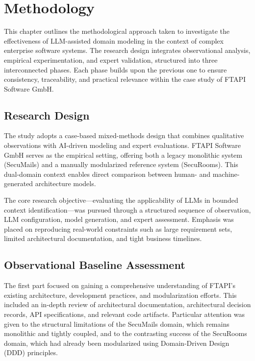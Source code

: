 \chapter{Methodology}\label{chapter:method}

This chapter outlines the methodological approach taken to investigate the effectiveness of LLM-assisted domain modeling in the context of complex enterprise software systems. The research design integrates observational analysis, empirical experimentation, and expert validation, structured into three interconnected phases. Each phase builds upon the previous one to ensure consistency, traceability, and practical relevance within the case study of FTAPI Software GmbH.

\section{Research Design}

The study adopts a case-based mixed-methods design that combines qualitative observations with AI-driven modeling and expert evaluations. FTAPI Software GmbH serves as the empirical setting, offering both a legacy monolithic system (SecuMails) and a manually modularized reference system (SecuRooms). This dual-domain context enables direct comparison between human- and machine-generated architecture models.

The core research objective—evaluating the applicability of LLMs in bounded context identification—was pursued through a structured sequence of observation, LLM configuration, model generation, and expert assessment. Emphasis was placed on reproducing real-world constraints such as large requirement sets, limited architectural documentation, and tight business timelines.

\section{Observational Baseline Assessment}

The first part focused on gaining a comprehensive understanding of FTAPI's existing architecture, development practices, and modularization efforts. This included an in-depth review of architectural documentation, architectural decision records, API specifications, and relevant code artifacts. Particular attention was given to the structural limitations of the SecuMails domain, which remains monolithic and tightly coupled, and to the contrasting success of the SecuRooms domain, which had already been modularized using Domain-Driven Design (DDD) principles.

